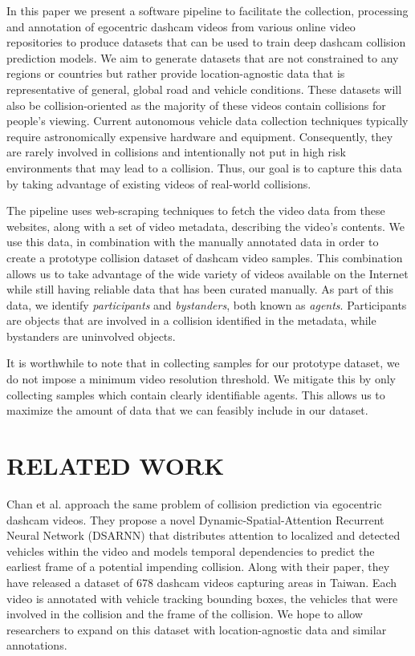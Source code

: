 \documentclass[letterpaper, 10 pt, conference]{ieeeconf}
\begin{document}
In this paper we present a software pipeline to facilitate the collection, processing and annotation of egocentric dashcam videos from various online video repositories to produce datasets that can be used to train deep dashcam collision prediction models.
We aim to generate datasets that are not constrained to any regions or countries but rather provide location-agnostic data that is representative of general, global road and vehicle conditions.
These datasets will also be collision-oriented as the majority of these videos contain collisions for people's viewing.
Current autonomous vehicle data collection techniques typically require astronomically expensive hardware and equipment. Consequently, they are rarely involved in collisions and intentionally not put in high risk environments that may lead to a collision.
Thus, our goal is to capture this data by taking advantage of existing videos of real-world collisions. 

The pipeline uses web-scraping techniques to fetch the video data from these websites, along with a set of video metadata, describing the video's contents.
We use this data, in combination with the manually annotated data in order to create a prototype collision dataset of dashcam video samples.
This combination allows us to take advantage of the wide variety of videos available on the Internet while still having reliable data that has been curated manually.
As part of this data, we identify \textit{participants} and \textit{bystanders}, both known as \textit{agents}. Participants are objects that are involved in a collision identified in the metadata, while bystanders are uninvolved objects. 

It is worthwhile to note that in collecting samples for our prototype dataset, we do not impose a minimum video resolution threshold. We mitigate this by only collecting samples which contain clearly identifiable agents. This allows us to maximize the amount of data that we can feasibly include in our dataset. 

\section{RELATED WORK}

Chan et al. \cite{chan2016anticipating} approach the same problem of collision prediction via egocentric dashcam videos. They propose a novel Dynamic-Spatial-Attention Recurrent Neural Network (DSARNN) that distributes attention to localized and detected vehicles within the video and models temporal dependencies to predict the earliest frame of a potential impending collision. Along with their paper, they have released a dataset of 678 dashcam videos capturing areas in Taiwan. Each video is annotated with vehicle tracking bounding boxes, the vehicles that were involved in the collision and the frame of the collision. We hope to allow researchers to expand on this dataset with location-agnostic data and similar annotations.
\end{document}
